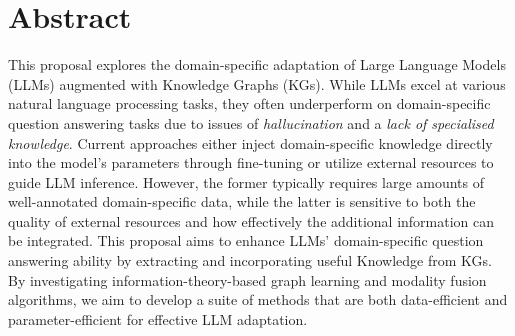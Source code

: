 \section*{Abstract}
This proposal explores the domain-specific adaptation of Large Language Models (LLMs) augmented with Knowledge Graphs (KGs). 
While LLMs excel at various natural language processing tasks, they often underperform on domain-specific question answering tasks due to issues of \emph{hallucination} and a \emph{lack of specialised knowledge}. 
Current approaches either inject domain-specific knowledge directly into the model's parameters through fine-tuning or utilize external resources to guide LLM inference. 
However, the former typically requires large amounts of well-annotated domain-specific data, while the latter is sensitive to both the quality of external resources and how effectively the additional information can be integrated. 
This proposal aims to enhance LLMs' domain-specific question answering ability by extracting and incorporating useful Knowledge from KGs. 
By investigating information-theory-based graph learning and modality fusion algorithms, we aim to develop a suite of methods that are both data-efficient and parameter-efficient for effective LLM adaptation. 
